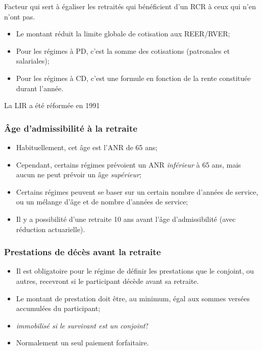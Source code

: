 \documentclass[10pt, french]{article}
\begin{document}
\begin{multicols*}{3}
\begin{definitionNOHFILL}
Facteur qui sert à égaliser les retraités qui bénéficient d'un RCR à ceux qui n'en n'ont pas.

\begin{itemize}[leftmargin = *]
	\item	Le montant réduit la limite globale de cotisation aux REER/RVER;
	\item	Pour les régimes à PD, c'est la somme des cotisations (patronales et salariales);
	\item	Pour les régimes à CD, c'est une formule en fonction de la rente constituée durant l'année.
\end{itemize}
\end{definitionNOHFILL}

La LIR a été réformée en 1991


\subsubsection*{Âge d'admissibilité à la retraite}
\begin{itemize}[leftmargin = *]
	\item	Habituellement, cet âge est l'ANR de 65 ans;
	\item	Cependant, certains régimes prévoient un ANR \textit{inférieur} à 65 ans, mais aucun ne peut prévoir un âge \textit{supérieur};
	\item	Certains régimes peuvent se baser sur un certain nombre d'années de service, ou un mélange d'âge et de nombre d'années de service;
	\item	Il y a possibilité d'une retraite 10 ans avant l'âge d'admissibilité (avec réduction actuarielle).
\end{itemize}


\subsubsection*{Prestations de décès avant la retraite}
\begin{itemize}[leftmargin = *]
	\item	Il est obligatoire pour le régime de définir les prestations que le conjoint, ou autres, recevront si le participant décède avant sa retraite.
	\item	Le montant de prestation doit être, au minimum, égal aux sommes versées accumulées du participant;
	\item	\textit{immobilisé si le survivant est un conjoint}?
	\item	Normalement un seul paiement forfaitaire.
\end{itemize}


\end{multicols*}
\end{document}
